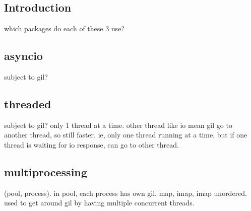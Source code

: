 
\subsection{Introduction}

which packages do each of these 3 use?

\subsection{asyncio}

subject to gil?

\subsection{threaded}

subject to gil? only 1 thread at a time. other thread like io mean gil go to another thread, so still faster. ie, only one thread running at a time, but if one thread is waiting for io response, can go to other thread.

\subsection{multiprocessing}

(pool, process). in pool, each process has own gil. map, imap, imap unordered. used to get around gil by having multiple concurrent threads.

